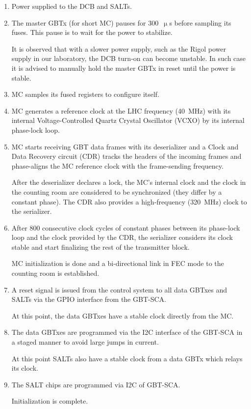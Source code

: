 \begin{enumerate}
    \item Power supplied to the DCB and SALTs.
    \item The master GBTx (for short MC) pauses for 300~$\upmu$s before
        sampling its fuses. This pause is to wait for the power to stabilize.

        It is observed that with a slower power supply,
        such as the Rigol power supply in our laboratory,
        the DCB turn-on can become unstable.
        In such case it is advised to manually hold the master GBTx in reset
        until the power is stable.

    \item MC samples its fused registers to configure itself.

    \item MC generates a reference clock at the LHC frequency (40~MHz) with
        its internal Voltage-Controlled Quartz Crystal Oscillator (VCXO)
        by its internal phase-lock loop.

    \item MC starts receiving GBT data frames with its deserializer and a Clock
        and Data Recovery circuit (CDR) tracks the headers of the incoming
        frames and phase-aligns the MC reference clock with the frame-sending
        frequency.

        After the deserializer declares a lock,
        the MC's internal clock and the clock in the counting room are
        considered to be synchronized
        (they differ by a constant phase).
        The CDR also provides a high-frequency (320~MHz) clock to the
        serializer.
    \item
        After 800 consecutive clock cycles of constant phases between its
        phase-lock loop and the clock provided by the CDR,
        the serializer considers its clock stable and start finalizing the rest
        of the transmitter block.

        MC initialization is done and a bi-directional link in FEC mode to the
        counting room is established.

    \item A reset signal is issued from the control system to all data GBTxes
        and SALTs via the GPIO interface from the GBT-SCA.

        At this point, the data GBTxes have a stable clock directly from the MC.

    \item The data GBTxes are programmed via the I2C interface of the GBT-SCA in
        a staged manner to avoid large jumps in current.

        At this point SALTs also have a stable clock from a data GBTx which
        relays its clock.

    \item The SALT chips are programmed via I2C of GBT-SCA.

        Initialization is complete.
\end{enumerate}


